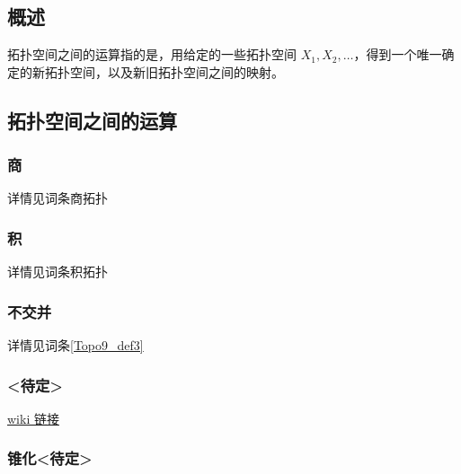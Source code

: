 
\begin{issues}
\issueDraft
\issueTODO
\issueMissDepend
\issueAbstract
\issueNeedCite
\end{issues}

\subsection{概述}

拓扑空间之间的运算指的是，用给定的一些拓扑空间 $X_1, X_2, \dots$，得到一个唯一确定的新拓扑空间，以及新旧拓扑空间之间的映射。


\subsection{拓扑空间之间的运算}

\subsubsection{商}

详情见词条商拓扑


\subsubsection{积}

详情见词条积拓扑


\subsubsection{不交并}

详情见词条\autoref{Topo9_def3}~


\subsubsection{<待定>}

\href{https://en.m.wikipedia.org/wiki/Join_(topology)}{wiki 链接}


\subsubsection{锥化<待定>}

